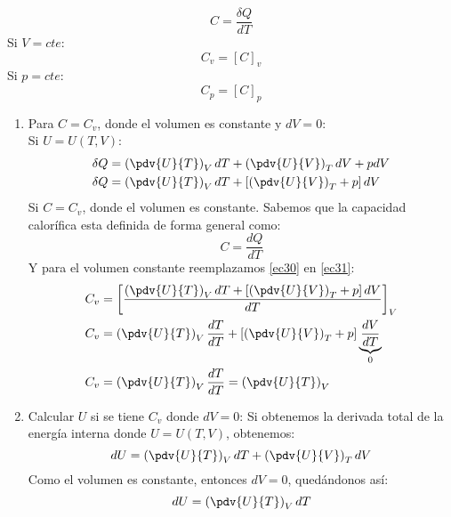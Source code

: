 \documentclass[../main]{subfiles}
\begin{document}
\begin{equation}
    C=\dfrac{\delta Q}{dT}
\end{equation}
Si $V=cte$:
\begin{equation}
    C_v=[C]_v
\end{equation}
Si $p=cte$:
\begin{equation}
    C_p=[C]_p
\end{equation}
\begin{enumerate}
    \item Para $C=C_v$, donde el volumen es constante y $dV=0$: \\
          Si $U=U(T,V)$:
          \begin{align}
              \delta Q & =\left(\pdv{U}{T}\right)_V dT+\left( \pdv{U}{V}\right)_T dV+pdV           \\
              \delta Q & =\left(\pdv{U}{T}\right)_V dT+\left[\left( \pdv{U}{V}\right)_T+p\right]dV
              \label{ec30}
          \end{align}
          Si $C=C_v$, donde el volumen es constante. Sabemos que la capacidad calorífica esta definida de forma general como:
          \begin{equation}
              C=\dfrac{dQ}{dT}
              \label{ec31}
          \end{equation}
          Y para el volumen constante reemplazamos \eqref{ec30} en \eqref{ec31}:
          \begin{align}
              C_v & =\left[\dfrac{\displaystyle \left(\pdv{U}{T}\right)_V dT+\left[\left( \pdv{U}{V}\right)_T+p\right]dV}{dT}\right]_V  \\
              C_v & = \left(\pdv{U}{T}\right)_V \dfrac{dT}{dT}+\left[ \left(\pdv{U}{V}\right)_T+p\right]\underbrace{\dfrac{dV}{dT}}_{0} \\
              C_v & =\left(\pdv{U}{T}\right)_V \dfrac{dT}{dT}=\left(\pdv{U}{T}\right)_V
          \end{align}
    \item Calcular $U$ si se tiene $C_v$ donde $dV=0$:
          Si obtenemos la derivada total de la energía interna donde $U=U(T,V)$, obtenemos:
          \begin{equation}
              dU=\left( \pdv{U}{T} \right)_V dT+\left( \pdv{U}{V} \right)_T dV
          \end{equation}
          Como el volumen es constante, entonces $dV=0$, quedándonos así:
          \begin{equation}
              dU=\left( \pdv{U}{T} \right)_V dT
          \end{equation}

\end{enumerate}
\end{document}
